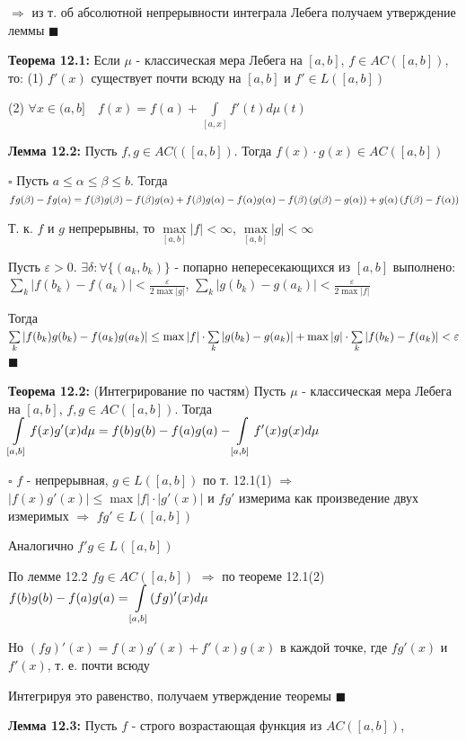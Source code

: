 \documentclass[a4paper]{report}
\newcommand*{\hm}[1]{#1\nobreak\discretionary{}%
            {\hbox{$\mathsurround=0pt #1$}}{}}
\begin{document}
$\Rightarrow$ из т. об абсолютной непрерывности интеграла Лебега получаем утверждение леммы $\blacksquare$
\bigskip

\noindent\textbf{Теорема 12.1:} Если $\mu$ - классическая мера Лебега на $[a,b]$, $f\in AC([a,b])$, то: (1) $f'(x)$ существует почти всюду на $[a,b]$ и $f'\in L([a,b])$

(2) $\forall x\in (a,b]\quad f(x)=f(a)+\displaystyle\int\limits_{[a,x]}f'(t)d\mu(t)$
\bigskip

\noindent\textbf{Лемма 12.2:} Пусть $f,g\in AC(([a,b])$. Тогда $f(x)\cdot g(x)\in AC([a,b])$

\noindent $\square$ Пусть $a\le\alpha\le\beta\le b$. Тогда $fg(\beta)-fg(\alpha)=f(\beta)g(\beta)-f(\beta)g(\alpha)\hm+f(\beta)g(\alpha)-f(\alpha)g(\alpha)-f(\beta)\left(g(\beta)-g(\alpha)\right)+g(\alpha)\left(f(\beta)-f(\alpha)\right)$

Т. к. $f$ и $g$ непрерывны, то $\max\limits_{[a,b]}|f|<\infty$, $\max\limits_{[a,b]}|g|<\infty$

Пусть $\varepsilon>0$. $\exists\delta\colon\forall\{(a_k,b_k)\}$ - попарно непересекающихся из $[a,b]$ выполнено:
$\sum\limits_k|f(b_k)-f(a_k)|<\frac{\varepsilon}{2\max|g|}$, $\sum\limits_k|g(b_k)-g(a_k)|<\frac{\varepsilon}{2\max|f|}$

Тогда $\sum\limits_k|f(b_k)g(b_k)-f(a_k)g(a_k)|\le\max|f|\cdot\sum\limits_k|g(b_k)-g(a_k)|+\max|g|\hm\cdot\sum\limits_k|f(b_k)-f(a_k)|<\varepsilon$ $\blacksquare$
\bigskip

\noindent\textbf{Теорема 12.2:} (Интегрирование по частям) Пусть $\mu$ - классическая мера Лебега на $[a,b]$, $f,g\in AC([a,b])$. Тогда $\displaystyle\int\limits_{[a,b]}f(x)g'(x)d\mu=f(b)g(b)-f(a)g(a)\hm-\displaystyle\int\limits_{[a,b]}f'(x)g(x)d\mu$

\noindent $\square$ $f$ - непрерывная, $g\in L([a,b])$  по т. 12.1(1) $\Rightarrow$ $|f(x)g'(x)|\le\max|f|\cdot|g'(x)|$ и $fg'$ измерима как произведение двух измеримых $\Rightarrow$ $fg'\in L([a,b])$

Аналогично $f'g\in L([a,b])$

По лемме 12.2 $fg\in AC([a,b])$ $\Rightarrow$ по теореме 12.1(2) $f(b)g(b)-f(a)g(a)\hm=\displaystyle\int\limits_{[a,b]}(fg)'(x)d\mu$

\noindent Но $(fg)'(x)=f(x)g'(x)+f'(x)g(x)$ в каждой точке, где $fg'(x)$ и $f'(x)$, т. е. почти всюду

Интегрируя это равенство, получаем утверждение теоремы $\blacksquare$
\bigskip

\noindent\textbf{Лемма 12.3:} Пусть $f$ - строго возрастающая функция из $AC([a,b])$, 
\end{document}
